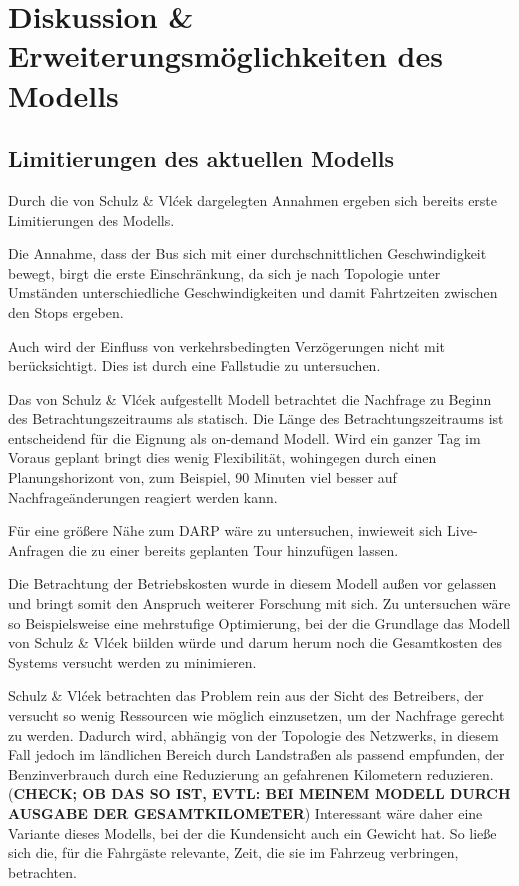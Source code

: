 \chapter{Diskussion \& Erweiterungsmöglichkeiten des Modells} \label{chapter:6}
\section{Limitierungen des aktuellen Modells}
Durch die von Schulz \& Vlćek dargelegten Annahmen ergeben sich bereits erste Limitierungen des Modells. 

Die Annahme, dass der Bus sich mit einer durchschnittlichen Geschwindigkeit bewegt, birgt die erste Einschränkung, da sich je nach Topologie unter Umständen unterschiedliche Geschwindigkeiten und damit Fahrtzeiten zwischen den Stops ergeben.

Auch wird der Einfluss von verkehrsbedingten Verzögerungen nicht mit berücksichtigt. Dies ist durch eine Fallstudie zu untersuchen.

Das von Schulz \& Vlćek aufgestellt Modell betrachtet die Nachfrage zu Beginn des Betrachtungszeitraums als statisch. Die Länge des Betrachtungszeitraums ist entscheidend für die Eignung als on-demand Modell. Wird ein ganzer Tag im Voraus geplant bringt dies wenig Flexibilität, wohingegen durch einen Planungshorizont von, zum Beispiel, 90 Minuten viel besser auf Nachfrageänderungen reagiert werden kann.

Für eine größere Nähe zum DARP wäre zu untersuchen, inwieweit sich Live-Anfragen die zu einer bereits geplanten Tour hinzufügen lassen.

Die Betrachtung der Betriebskosten wurde in diesem Modell außen vor gelassen und bringt somit den Anspruch weiterer Forschung mit sich. 
        Zu untersuchen wäre so Beispielsweise eine mehrstufige Optimierung, bei der die Grundlage das Modell von Schulz \& Vlćek biilden würde und darum herum noch die Gesamtkosten des Systems versucht werden zu minimieren.



Schulz \& Vlćek betrachten das Problem rein aus der Sicht des Betreibers, der versucht so wenig Ressourcen wie möglich einzusetzen, um der Nachfrage gerecht zu werden. Dadurch wird, abhängig von der Topologie des Netzwerks, in diesem Fall jedoch im ländlichen Bereich durch Landstraßen als passend empfunden, der Benzinverbrauch durch eine Reduzierung an gefahrenen Kilometern reduzieren. (\textbf{CHECK; OB DAS SO IST, EVTL: BEI MEINEM MODELL DURCH AUSGABE DER GESAMTKILOMETER}) Interessant wäre daher eine Variante dieses Modells, bei der die Kundensicht auch ein Gewicht hat. So ließe sich die, für die Fahrgäste relevante, Zeit, die sie im Fahrzeug verbringen, betrachten.

